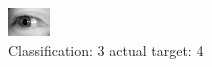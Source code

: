 \begin{figure}[h!]
\begin{center}
\includegraphics[width=0.60\columnwidth]{figures/ID3162_class_3_target_4.png}
\end{center}
\caption{ Classification: 3 actual target: 4}
\label{fig:ID3162_class_3_target_4}
\end{figure}
